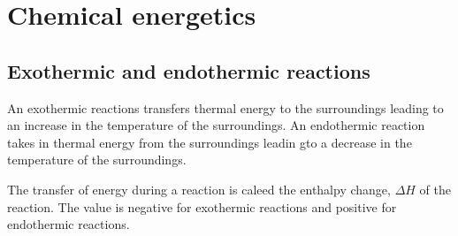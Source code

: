 \section{Chemical energetics}
\subsection{Exothermic and endothermic reactions}

An exothermic reactions transfers thermal energy to the surroundings leading to an increase in the
temperature of the surroundings. An endothermic reaction takes in thermal energy from the 
surroundings leadin gto a decrease in the temperature of the surroundings.

The transfer of energy during a reaction is caleed the enthalpy change, $\Delta H$ of the reaction.
The value is negative for exothermic reactions and positive for endothermic reactions.

